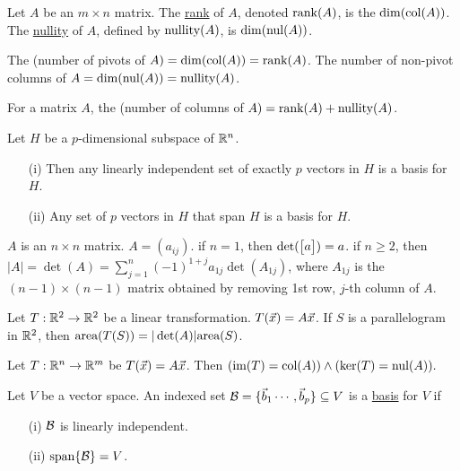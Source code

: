 \documentclass[10pt,a4paper]{article}
\begin{document}

\begin{definition}
	Let $A$ be an $m\times n$ matrix. The \underline{rank} of $A$, denoted $\text{rank}(A)$, is the $\dim(\text{col}(A))$. The \underline{nullity} of $A$, defined by $\text{nullity}(A)$, is $\dim(\text{nul}(A))$.
\end{definition}
\begin{note}
	The (number of pivots of $A) = \dim(\text{col}(A)) = \text{rank}(A)$. The number of non-pivot columns of $A = \dim(\text{nul}(A)) = \text{nullity}(A)$. 
\end{note}

\begin{theorem}
	For a matrix $A$, the (number of columns of $A) = \text{rank}(A)+\text{nullity}(A)$.
\end{theorem}

\begin{theorem}
	Let $H$ be a $p$-dimensional subspace of $\mathbb{R}^n$. 
	\begin{enumerate}
		\item[(i)] Then any linearly independent set of exactly $p$ vectors in $H$ is a basis for $H$. 
		\item[(ii)] Any set of $p$ vectors in $H$ that span $H$ is a basis for $H$.
	\end{enumerate}
\end{theorem}

\begin{definition}[Determinants]
	$A$ is an $n\times n$ matrix. $A = (a_{ij})$. if $n=1$, then $\det(\begin{bmatrix}a\end{bmatrix}) = a$. if $n\geq 2$, then $|A| = \det(A) = \sum_{j=1}^n (-1)^{1+j} a_{1j} \det(A_{1j})$, where $A_{1j}$ is the $(n-1)\times (n-1)$ matrix obtained by removing 1st row, $j$-th column of $A$.
\end{definition}

\begin{theorem}
	Let $T: \mathbb{R}^2 \rightarrow \mathbb{R}^2$ be a linear transformation. $T(\vec{x}) = A\vec{x}$. If $S$ is a parallelogram in $\mathbb{R}^2$, then $\text{area}(T(S)) = |\det(A)| \text{area}(S)$. 
\end{theorem}

\begin{remark}
	Let $T:\mathbb{R}^n \rightarrow \mathbb{R}^m$ be $T(\vec{x}) = A\vec{x}$. Then $(\text{im}(T) = \text{col}(A)) \land (\ker(T) = \text{nul}(A)).$
\end{remark}

\begin{definition}
	Let $V$ be a vector space. An indexed set $\mathcal{B} = \{\vec{b}_1\cdots,\vec{b}_p\}\subseteq V$ is a \underline{basis} for $V$ if
	\begin{enumerate}
		\item[(i)] $\mathcal{B}$ is linearly independent.
		\item[(ii)] $\text{span}\{\mathcal{B}\} = V$.
	\end{enumerate}
\end{definition}
\end{document}
